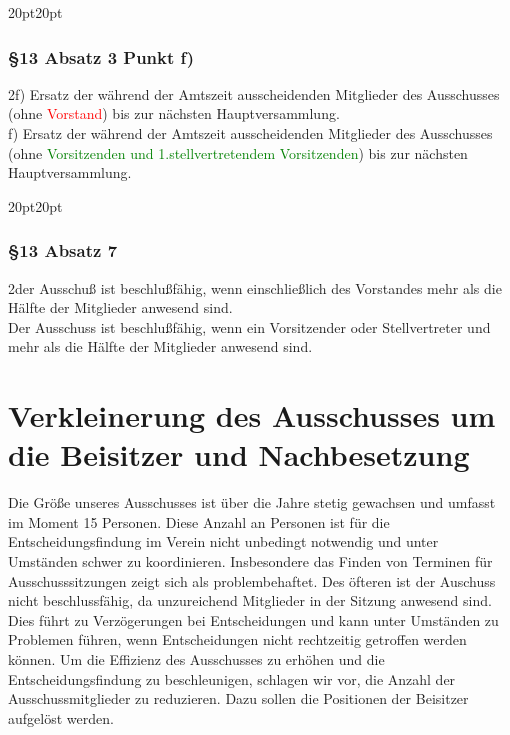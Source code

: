 \documentclass[10pt,a4paper,parskip=half]{scrartcl}
\newcommand{\new}[1]{\textcolor{Green}{#1}}
\newcommand{\old}[1]{\textcolor{Red}{#1}}
\newcommand{\change}[1]{
  \begin{adjustwidth}{20pt}{20pt}
    #1
  \end{adjustwidth}
}
\newcommand{\compare}[3]{\change{\subsubsection*{#1}\begin{multicols}{2}#2\columnbreak\\#3\end{multicols}}}
\begin{document}
    \compare{§13 Absatz 3 Punkt f)}
    {f) Ersatz der während der Amtszeit ausscheidenden Mitglieder des Ausschusses (ohne \old{Vorstand}) bis zur nächsten Hauptversammlung.}
    {f) Ersatz der während der Amtszeit ausscheidenden Mitglieder des Ausschusses (ohne \new{Vorsitzenden und 1.stellvertretendem Vorsitzenden}) bis zur nächsten Hauptversammlung.}

    \compare{§13 Absatz 7}
    {der Ausschuß ist beschlußfähig, wenn einschließlich des Vorstandes mehr als die Hälfte der Mitglieder anwesend sind.}
    {Der Ausschuss ist beschlußfähig, wenn ein Vorsitzender oder Stellvertreter und mehr als die Hälfte der Mitglieder anwesend sind.}



  \section{Verkleinerung des Ausschusses um die Beisitzer und Nachbesetzung}
  Die Größe unseres Ausschusses ist über die Jahre stetig gewachsen und umfasst im Moment 15 Personen. Diese Anzahl an Personen ist für die Entscheidungsfindung im Verein nicht unbedingt notwendig und unter Umständen schwer zu koordinieren. Insbesondere das Finden von Terminen für Ausschusssitzungen zeigt sich als problembehaftet. Des öfteren ist der Auschuss nicht beschlussfähig, da unzureichend Mitglieder in der Sitzung anwesend sind. Dies führt zu Verzögerungen bei Entscheidungen und kann unter Umständen zu Problemen führen, wenn Entscheidungen nicht rechtzeitig getroffen werden können. Um die Effizienz des Ausschusses zu erhöhen und die Entscheidungsfindung zu beschleunigen, schlagen wir vor, die Anzahl der Ausschussmitglieder zu reduzieren. Dazu sollen die Positionen der Beisitzer aufgelöst werden.
\end{document}
